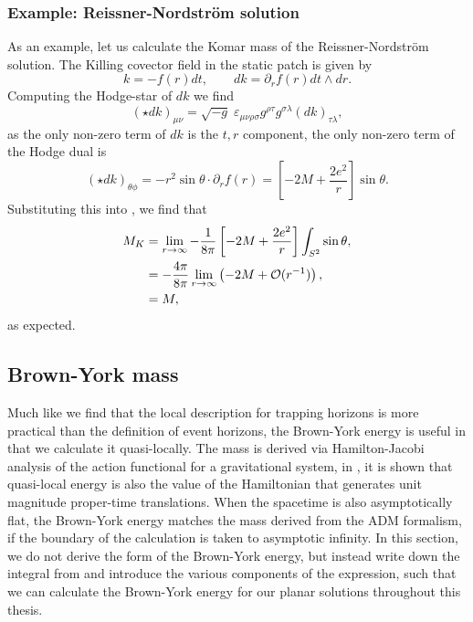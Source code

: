 \subsubsection*{Example: Reissner-Nordstr\"om solution}
As an example, let us calculate the Komar mass of the Reissner-Nordstr\"om solution. The Killing covector field in the static patch is given by
\begin{equation*}
	k = -f(r) dt, \qquad dk = \partial_r f(r) dt \wedge dr.
\end{equation*}
Computing the Hodge-star of $dk$ we find
\begin{equation*}
	(\star dk)_{\mu \nu} = \sqrt{-g}
 \; \varepsilon_{\mu \nu \rho \sigma} g^{\rho \tau} g^{\sigma \lambda} (dk)_{\tau \lambda} ,
 \end{equation*}
as the only non-zero term of $dk$ is the $t,r$ component, the only non-zero term of the Hodge dual is
\begin{equation*}
	(\star dk)_{\theta \phi} = - r^2 \sin \theta \cdot \partial_r f(r) = \left[- 2M + \frac{2e^2}{r} \right] \sin \theta.
\end{equation*}
Substituting this into , we find that
\begin{equation*}
\begin{aligned}
M_K &= \lim_{r \rightarrow \infty} -\frac{1}{8 \pi} \left[- 2M + \frac{2e^2}{r} \right]  \int_{S^2} \sin \theta, \\
&= -\frac{4 \pi}{8\pi} \lim_{r \rightarrow \infty} \left( -2M + {\cal O}(r^{-1}) \right), \\
&= M,
\end{aligned}
\end{equation*}
as expected.



\subsection{Brown-York mass}
\label{sec:brownyorkmass}

Much like we find that the local description for trapping horizons is more practical than the definition of event horizons, the Brown-York energy \cite{Brown:1992br} is useful in that we calculate it quasi-locally. The mass is derived via Hamilton-Jacobi analysis of the action functional for a gravitational system, in \cite{Brown:1992br}, it is shown that quasi-local energy is also the value of the Hamiltonian that generates unit magnitude proper-time translations. When the spacetime is also asymptotically flat, the Brown-York energy matches the mass derived from the ADM formalism, if the boundary of the calculation is taken to asymptotic infinity. In this section, we do not derive the form of the Brown-York energy, but instead write down the integral from \cite{Brown:1992br} and introduce the various components of the expression, such that we can calculate the Brown-York energy for our planar solutions throughout this thesis. 


